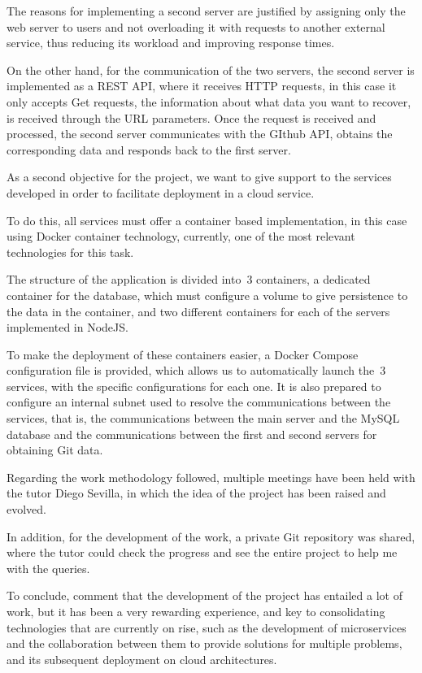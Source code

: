 The reasons for implementing a second server are justified by
assigning only the web server to users and not overloading it with
requests to another external service, thus reducing its workload and
improving response times.

On the other hand, for the communication of the two servers, the
second server is implemented as a REST API, where it receives HTTP
requests, in this case it only accepts Get requests, the information
about what data you want to recover, is received through the URL
parameters. Once the request is received and processed, the second
server communicates with the GIthub API, obtains the corresponding
data and responds back to the first server.

As a second objective for the project, we want to give support to the
services developed in order to facilitate deployment in a cloud
service.

To do this, all services must offer a container based implementation,
in this case using Docker container technology, currently, one of
the most relevant technologies for this task.

The structure of the application is divided into~3 containers, a
dedicated container for the database, which must configure a volume to
give persistence to the data in the container, and two different
containers for each of the servers implemented in NodeJS.

To make the deployment of these containers easier, a Docker Compose
configuration file is provided, which allows us to automatically
launch the~3 services, with the specific configurations for each one.
It is also prepared to configure an internal subnet used to resolve
the communications between the services, that is, the communications
between the main server and the MySQL database and the communications
between the first and second servers for obtaining Git data.

Regarding the work methodology followed, multiple meetings have been
held with the tutor Diego Sevilla, in which the idea of the project
has been raised and evolved.


In addition, for the development of the work, a private Git repository
was shared, where the tutor could check the progress and see the
entire project to help me with the queries.

To conclude, comment that the development of the project has entailed
a lot of work, but it has been a very rewarding experience, and key to
consolidating technologies that are currently on rise, such as the
development of microservices and the collaboration between them to
provide solutions for multiple problems, and its subsequent deployment
on cloud architectures.

